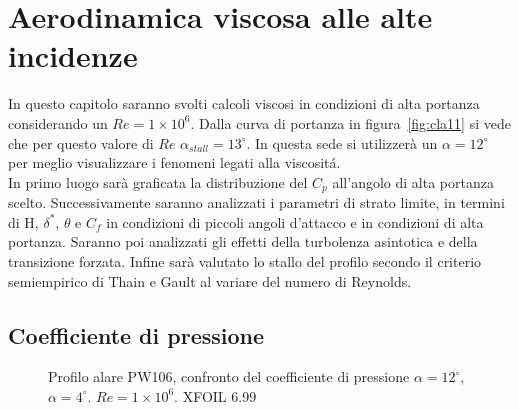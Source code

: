 \chapter{Aerodinamica viscosa alle alte incidenze}
In questo capitolo saranno svolti calcoli viscosi in condizioni di alta portanza considerando un $Re=1\times10^6$.
Dalla curva di portanza in figura~\vref{fig:cla11} si vede che per questo valore di $Re$ $ {\alpha}_{stall}=13^\circ$. In questa sede si utilizzerà un  {\bfseries $\alpha=12^\circ$} per meglio visualizzare i fenomeni legati alla viscositá.\\ 
In primo luogo sarà graficata la distribuzione del $C_p$ all’angolo di alta portanza scelto. Successivamente saranno analizzati i parametri di strato limite, in termini di H, ${\delta^*}$, ${\theta}$ e $C_f$ in condizioni di piccoli angoli d’attacco e in condizioni di alta portanza. Saranno poi analizzati gli effetti della turbolenza asintotica e della transizione forzata. Infine sarà valutato lo stallo del profilo secondo il criterio semiempirico di Thain e Gault al variare del numero di Reynolds.
\section{Coefficiente di pressione}
\begin{figure} [H]
\centering
{}
\caption{\footnotesize Profilo alare PW106, confronto del coefficiente di pressione $ \alpha=12^\circ$,$ \alpha=4^\circ$. $Re=1\times10^6$. XFOIL 6.99}
\end{figure}

